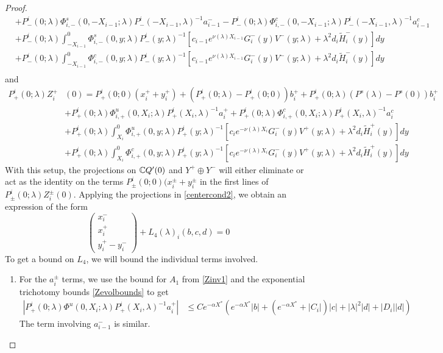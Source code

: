 \documentclass[thesis.tex]{subfiles}
\begin{document}
\begin{lemma}
\begin{proof}
\begin{align*}
&+ P^i_-(0; \lambda) \Phi^s_{i,-}(0, -X_{i-1}; \lambda) P^i_-(-X_{i-1}, \lambda)^{-1} a_{i-1}^- - P^i_-(0; \lambda) \Phi^c_{i,-}(0, -X_{i-1}; \lambda) P^i_-(-X_{i-1}, \lambda)^{-1} a_{i-1}^c \\
&+ P^i_-(0; \lambda) \int_{-X_{i-1}}^0 \Phi^s_{i,-}(0, y; \lambda) P^i_-(y; \lambda)^{-1}[ c_{i-1} e^{\nu(\lambda)X_{i-1}} G_i^-(y) V^-(y; \lambda) + \lambda^2 d_i \tilde{H}_i^-(y)] dy \\
&+ P^i_-(0; \lambda) \int_{-X_{i-1}}^0 \Phi^c_{i,-}(0, y; \lambda) P^i_-(y; \lambda)^{-1}[ c_{i-1} e^{\nu(\lambda)X_{i-1}} G_i^-(y) V^-(y; \lambda) + \lambda^2 d_i \tilde{H}_i^-(y)] dy  \\
\end{align*}
and
\begin{align*}
P^i_+(0; \lambda) Z_i^+&(0) = P^i_+(0; 0)(x_i^+ + y_i^+) + (P^i_+(0; \lambda) - P^i_+(0; 0))b_i^+ + P^i_+(0; \lambda) (P^s(\lambda) - P^s(0)) b_i^+ \\
&+ P^i_+(0; \lambda) \Phi^u_{i,+}(0, X_i; \lambda) P^i_+(X_i, \lambda)^{-1} a_i^+ + P^i_+(0; \lambda) \Phi^c_{i,+}(0, X_i; \lambda) P^i_+(X_i, \lambda)^{-1} a_i^c \\
&+ P^i_+(0; \lambda) \int_{X_i}^0 \Phi^u_{i,+}(0, y; \lambda) P^i_+(y; \lambda)^{-1} [ c_i e^{-\nu(\lambda)X_i} G_i^-(y)V^+(y; \lambda) + \lambda^2 d_i \tilde{H}_i^+(y)] dy \\
&+ P^i_+(0; \lambda) \int_{X_i}^0 \Phi^c_{i,+}(0, y; \lambda) P^i_+(y; \lambda)^{-1} [ c_i e^{-\nu(\lambda)X_i} G_i^-(y)V^+(y; \lambda) + \lambda^2 d_i \tilde{H}_i^+(y)] dy 
\end{align*}
With this setup, the projections on $\mathbb{C} Q'(0)$ and $Y^+ \oplus Y^-$ will either eliminate or act as the identity on the terms $P^i_\pm(0; 0)(x_i^\pm + y_i^\pm$ in the first lines of $P^i_\pm(0; \lambda) Z_i^\pm(0)$. Applying the projections in \eqref{centercond2}, we obtain an expression of the form
\begin{equation}\label{projxy}
\begin{pmatrix}x_i^- \\ x_i^+ \\ 
y_i^+ - y_i^- \end{pmatrix} + L_4(\lambda)_i(b, c, d) = 0
\end{equation}
To get a bound on $L_4$, we will bound the individual terms involved. 

\begin{enumerate}
\item For the $a_i^\pm$ terms, we use the bound for $A_1$ from \cref{Zinv1} and the exponential trichotomy bounds \cref{Zevolbounds} to get
\begin{align*}
|P^i_+(0; \lambda) \Phi^u(0, X_i; \lambda) P^i_+(X_i, \lambda)^{-1} a_i^+| 
&\leq C e^{-\alpha X^*} \left( e^{-\alpha X^*} |b| + (e^{-\alpha X^*} + |C_i|)|c| + |\lambda|^2 |d| + |D_i||d| \right)
\end{align*}
The term involving $a_{i-1}^-$ is similar.


\end{enumerate}
\end{proof}
\end{lemma}
\end{document}
